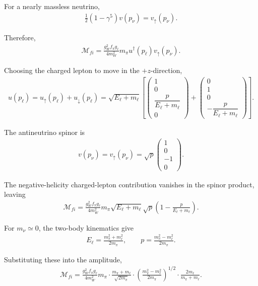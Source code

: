 For a nearly massless neutrino,
\begin{align}
\frac{1}{2}(1-\gamma^5)v(p_\nu)
=
v_\uparrow(p_\nu).
\end{align}

Therefore,
\begin{align}
\mathcal{M}_{fi}
=
\frac{g_W^2 f_\pi g_\ell}{4m_W^2}
m_\pi
u^\dagger(p_\ell)v_\uparrow(p_\nu).
\end{align}

Choosing the charged lepton to move in the \(+z\)-direction,
\begin{align}
u(p_\ell)
=
u_\uparrow(p_\ell)+u_\downarrow(p_\ell)
=
\sqrt{E_\ell+m_\ell}
\left[
\begin{pmatrix}
1 \\
0 \\
\dfrac{p}{E_\ell+m_\ell} \\
0
\end{pmatrix}
+
\begin{pmatrix}
0 \\
1 \\
0 \\
-\dfrac{p}{E_\ell+m_\ell}
\end{pmatrix}
\right].
\end{align}

The antineutrino spinor is
\begin{align}
v(p_\nu)
=
v_\uparrow(p_\nu)
=
\sqrt{p}
\begin{pmatrix}
1 \\
0 \\
-1 \\
0
\end{pmatrix}.
\end{align}

The negative-helicity charged-lepton contribution vanishes in the spinor product, leaving
\begin{align}
\mathcal{M}_{fi}
=
\frac{g_W^2 f_\pi g_\ell}{4m_W^2}
m_\pi
\sqrt{E_\ell+m_\ell}\sqrt{p}
\left(
1-\frac{p}{E_\ell+m_\ell}
\right).
\end{align}

For \(m_\nu \simeq 0\), the two-body kinematics give
\begin{align}
E_\ell
=
\frac{m_\pi^2+m_\ell^2}{2m_\pi},
\qquad
p
=
\frac{m_\pi^2-m_\ell^2}{2m_\pi}.
\end{align}

Substituting these into the amplitude,
\begin{align}
\mathcal{M}_{fi}
=
\frac{g_W^2 f_\pi g_\ell}{4m_W^2}
m_\pi
\cdot
\frac{m_\pi+m_\ell}{\sqrt{2m_\pi}}
\cdot
\left(
\frac{m_\pi^2-m_\ell^2}{2m_\pi}
\right)^{1/2}
\cdot
\frac{2m_\ell}{m_\pi+m_\ell}.
\end{align}

